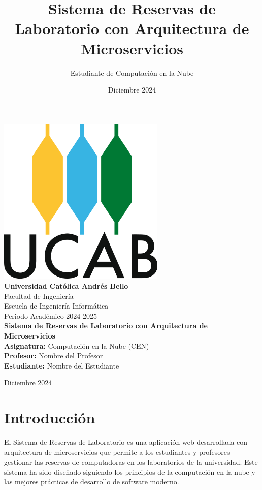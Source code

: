 \documentclass[12pt,a4paper]{article}
\title{Sistema de Reservas de Laboratorio con Arquitectura de Microservicios}
\author{Estudiante de Computación en la Nube}
\date{Diciembre 2024}
\begin{document}
\begin{titlepage}
    \centering
    \includegraphics[width=0.6\textwidth]{images/Logo_UCAB_3.png}\\[1cm]
    
    {\LARGE\textbf{Universidad Católica Andrés Bello}}\\[0.5cm]
    {\Large Facultad de Ingeniería}\\[0.3cm]
    {\large Escuela de Ingeniería Informática}\\[0.3cm]
    {\large Periodo Académico 2024-2025}\\[2cm]
    
    {\huge\textbf{Sistema de Reservas de Laboratorio con Arquitectura de Microservicios}}\\[2cm]
    
    {\large\textbf{Asignatura:} Computación en la Nube (CEN)}\\[0.5cm]
    {\large\textbf{Profesor:} Nombre del Profesor}\\[0.5cm]
    {\large\textbf{Estudiante:} Nombre del Estudiante}\\[2cm]
    
    \vfill
    
    {\large Diciembre 2024}
\end{titlepage}

\newpage
\tableofcontents
\newpage

\section{Introducción}

El Sistema de Reservas de Laboratorio es una aplicación web desarrollada con arquitectura de microservicios que permite a los estudiantes y profesores gestionar las reservas de computadoras en los laboratorios de la universidad. Este sistema ha sido diseñado siguiendo los principios de la computación en la nube y las mejores prácticas de desarrollo de software moderno.
\end{document}
